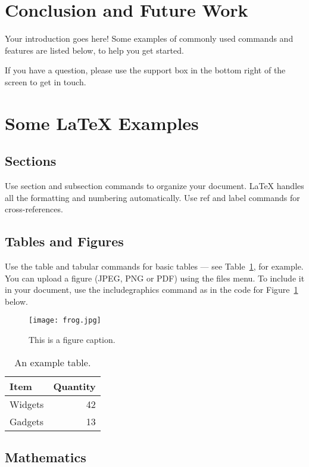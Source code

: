 \section{Conclusion and Future Work}



Your introduction goes here! Some examples of commonly used commands and features are listed below, to help you get started.

If you have a question, please use the support box in the bottom right of the screen to get in touch. 

\section{Some \LaTeX{} Examples}
\label{sec:examples}

\subsection{Sections}

Use section and subsection commands to organize your document. \LaTeX{} handles all the formatting and numbering automatically. Use ref and label commands for cross-references.

\subsection{Tables and Figures}

Use the table and tabular commands for basic tables --- see Table~\ref{tab:widgets}, for example. You can upload a figure (JPEG, PNG or PDF) using the files menu. To include it in your document, use the includegraphics command as in the code for Figure~\ref{fig:frog} below.

\begin{figure}
\centering
\texttt{[image: frog.jpg]}
\caption{\label{fig:frog}This is a figure caption.}
\end{figure}

\begin{table}
\centering
\begin{tabular}{l|r}
Item & Quantity \\\hline
Widgets & 42 \\
Gadgets & 13
\end{tabular}
\caption{\label{tab:widgets}An example table.}
\end{table}

\subsection{Mathematics}

